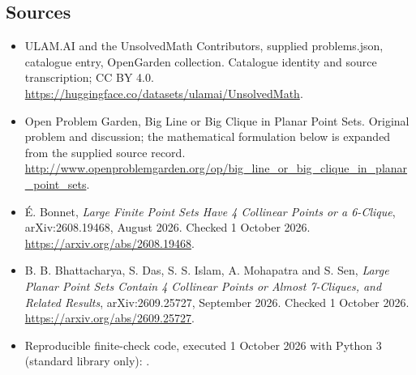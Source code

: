 \documentclass[11pt,a4paper]{article}
\begin{document}
\subsection{Sources}
\begin{itemize}
\item[S1] ULAM.AI and the UnsolvedMath Contributors, supplied problems.json, catalogue entry, OpenGarden collection. Catalogue identity and source transcription; CC BY 4.0.
\url{https://huggingface.co/datasets/ulamai/UnsolvedMath}.
\item[S2] Open Problem Garden, Big Line or Big Clique in Planar Point Sets. Original problem and discussion; the mathematical formulation below is expanded from the supplied source record.
\url{http://www.openproblemgarden.org/op/big_line_or_big_clique_in_planar_point_sets}.
\item[S3] É. Bonnet, \emph{Large Finite Point Sets Have 4 Collinear Points or a 6-Clique}, arXiv:2608.19468, August 2026. Checked 1 October 2026.
\url{https://arxiv.org/abs/2608.19468}.
\item[S4] B. B. Bhattacharya, S. Das, S. S. Islam, A. Mohapatra and S. Sen, \emph{Large Planar Point Sets Contain 4 Collinear Points or Almost 7-Cliques, and Related Results}, arXiv:2609.25727, September 2026. Checked 1 October 2026.
\url{https://arxiv.org/abs/2609.25727}.
\item[C1] Reproducible finite-check code, executed 1 October 2026 with Python 3 (standard library only):
.
\end{itemize}
\end{document}
